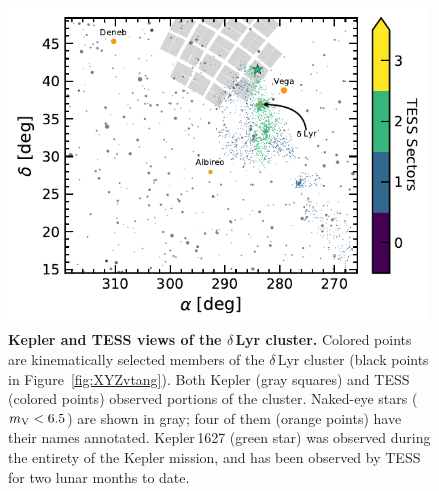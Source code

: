 \documentclass[12pt,modern,tighten]{aastex63}
\begin{document}

\begin{figure}[t]
	\begin{center}
		\leavevmode
		\includegraphics[width=0.99\textwidth]{f2.pdf}
	\end{center}
	\vspace{-0.7cm}
	\caption{
		{\bf Kepler and TESS views of the $\delta$\,Lyr cluster.} Colored
		points are kinematically selected members of the $\delta$\,Lyr
		cluster (black points in Figure~\ref{fig:XYZvtang}).  Both Kepler
		(gray squares) and TESS (colored points) observed portions of the
		cluster.  Naked-eye stars ($m_{\rm V}<6.5$) are shown in gray; four
		of them (orange points) have their names annotated.  Kepler\,1627 (green
		star) was observed during the entirety of the Kepler mission, and
		has been observed  by TESS for two lunar months to date.
		\label{fig:skychart}
	}
\end{figure}
\end{document}
